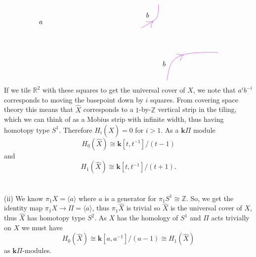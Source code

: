 \documentclass{article}
\newcommand{\R}{\mathbb{R}}
\newcommand{\Z}{\mathbb{Z}}
\begin{document}
\[\begin{tikzpicture}[x=0.75pt,y=0.75pt,yscale=-1,xscale=1]
\draw [color={rgb, 255:red, 189; green, 16; blue, 224 }  ,draw opacity=1 ]   (410.27,212.4) .. controls (418.27,173.4) and (415.27,155.4) .. (509.27,158.4) ;
\draw [color={rgb, 255:red, 189; green, 16; blue, 224 }  ,draw opacity=1 ]   (361,111) .. controls (396.27,91.4) and (393.27,94.4) .. (394.27,65.4) ;
\draw  [color={rgb, 255:red, 189; green, 16; blue, 224 }  ,draw opacity=1 ] (370.4,98.49) .. controls (376.03,99.61) and (380.58,99.36) .. (384.09,97.75) .. controls (381.65,100.74) and (380.28,105.09) .. (379.96,110.82) ;
\draw  [color={rgb, 255:red, 189; green, 16; blue, 224 }  ,draw opacity=1 ] (428.99,160.97) .. controls (434.35,163.02) and (438.88,163.55) .. (442.6,162.55) .. controls (439.7,165.08) and (437.61,169.14) .. (436.33,174.73) ;

\draw (162,96.4) node [anchor=north west][inner sep=0.75pt]    {$a$};
\draw (369,80.4) node [anchor=north west][inner sep=0.75pt]    {$b$};
\draw (401,174.4) node [anchor=north west][inner sep=0.75pt]    {$b$};


\end{tikzpicture}
\]
If we tile $\R^2$ with these squares to get the universal cover of $X$, we note that $a^ib^{-i}$ corresponds to moving the basepoint down by $i$ squares. From covering space theory this means that $\widehat{X}$ corresponds to a $1$-by-$\Z$ vertical strip in the tiling, which we can think of as a Mobius strip with infinite width, thus having homotopy type $S^1$. Therefore $H_i(\widehat{X}) = 0$ for $i >1$. As a $\textbf{k}\Pi$ module 
\[
H_0(\widehat{X}) \cong \textbf{k}[t,t^{-1}]/(t-1)
\]
and \[
H_1(\widehat{X}) \cong \textbf{k}[t,t^{-1}]/(t+1).
\]
\\ \\
(ii) We know $\pi_1X = \langle a \rangle$ where $a$ is a generator for $\pi_1 S^1 \cong \Z$. So, we get the identity map $\pi_1 X \to \Pi = \langle a \rangle$, thus $\pi_1\widehat{X}$ is trivial so $\widehat{X}$ is the universal cover of $X$, thus $\widehat{X}$ has homotopy type $S^2$. As $X$ has the homology of $S^1$ and $\Pi$ acts trivially on $X$ we must have 
\[
H_0(\widehat{X}) \cong \textbf{k}[a,a^{-1}]/(a-1) \cong H_1(\widehat{X})
\]
as $\textbf{k}\Pi$-modules.
\end{document}

